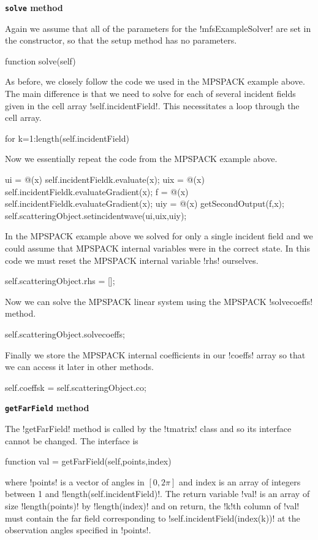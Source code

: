 \documentclass[12pt,letterpaper,final]{article}
\newcommand{\techheading}[1]{%
    \par\vspace{-0.3\parskip}\noindent\hspace{-1cm}\textbf{#1}%
    \par\vspace{-0.5\parskip}\noindent\nopagebreak\ignorespaces}
\begin{document}
\techheading{\texttt{solve} method}
Again we assume that all of the parameters for the !mfsExampleSolver! are set
in the constructor, so that the setup method has no parameters.
\begin{matlab}
function solve(self)
\end{matlab}
As before, we closely follow the code we used in the MPSPACK example above.
The main difference is that we need to solve for each of several incident 
fields given in the cell array !self.incidentField!.
This necessitates a loop through the cell array.
\begin{matlab}
    for k=1:length(self.incidentField)
\end{matlab}
Now we essentially repeat the code from the MPSPACK example above.
\begin{matlab}                
        ui = @(x) self.incidentField{k}.evaluate(x);
        uix = @(x) self.incidentField{k}.evaluateGradient(x);
        f = @(x) self.incidentField{k}.evaluateGradient(x);
        uiy = @(x) getSecondOutput(f,x);                
        self.scatteringObject.setincidentwave(ui,uix,uiy);
\end{matlab}
In the MPSPACK example above we solved for only a single incident field
and we could assume that MPSPACK internal variables were in the correct
state.
In this code we must reset the MPSPACK internal variable !rhs! ourselves.
\begin{matlab}    
        self.scatteringObject.rhs = [];                
\end{matlab}
Now we can solve the MPSPACK linear system using the MPSPACK !solvecoeffs! 
method.
\begin{matlab}
        self.scatteringObject.solvecoeffs;                
\end{matlab}
Finally we store the MPSPACK internal coefficients in our !coeffs! array
so that we can access it later in other methods.
\begin{matlab}
        self.coeffs{k} = self.scatteringObject.co;                
\end{matlab}

\techheading{\texttt{getFarField} method}
The !getFarField! method is called by the !tmatrix! class and so its interface
cannot be changed. 
The interface is
\begin{matlab}
        function val = getFarField(self,points,index)
\end{matlab}
where !points! is a vector of angles in $[0,2 \pi]$ and index is
an array of integers between 1 and !length(self.incidentField)!.
The return variable !val! is an array of size !length(points)!
by !length(index)! and on return, the !k!th column of !val! must contain the
far field corresponding to !self.incidentField(index(k))!
at the observation angles specified in !points!.
\end{document}
